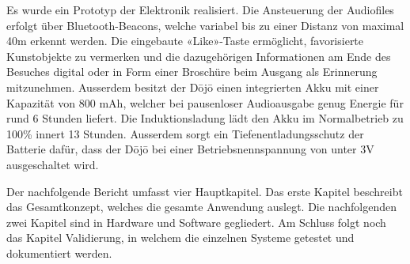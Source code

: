 Es wurde ein Prototyp der Elektronik realisiert. Die Ansteuerung der Audiofiles erfolgt über Bluetooth-Beacons, welche variabel bis zu einer Distanz von maximal 40m erkennt werden. Die eingebaute «Like»-Taste ermöglicht, favorisierte Kunstobjekte zu vermerken und die dazugehörigen Informationen am Ende des Besuches digital oder in Form einer Broschüre beim Ausgang als Erinnerung mitzunehmen. Ausserdem besitzt der Dōjō einen integrierten Akku mit einer Kapazität von 800 mAh, welcher bei pausenloser Audioausgabe genug Energie für rund 6 Stunden liefert. Die Induktionsladung lädt den Akku im Normalbetrieb zu 100\% innert 13 Stunden. Ausserdem sorgt ein Tiefenentladungsschutz der Batterie dafür, dass der Dōjō bei einer Betriebsnennspannung von unter 3V ausgeschaltet wird.

Der nachfolgende Bericht umfasst vier Hauptkapitel. Das erste Kapitel beschreibt das Gesamtkonzept, welches die gesamte Anwendung auslegt. Die nachfolgenden zwei Kapitel sind in Hardware und Software gegliedert. Am Schluss folgt noch das Kapitel Validierung, in welchem die einzelnen Systeme getestet und dokumentiert werden.

 